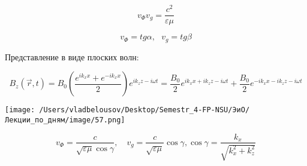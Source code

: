 \documentclass[12pt, a4paper]{report}
\begin{document}
\[ v_{\Phi } v_g = \frac{ c ^2 }{\varepsilon \mu}   \] 

\[ v_{\Phi } = tg \alpha , \text{ }  v_g =  tg \beta \] 

Представление в виде плоских волн: 

\[ B_z (\vec{r }, t ) = B_0 \left( \frac{ e^{i k_x x } + e^{-i k_x x } }{2} \right) e^{i k_z z - i \omega t}  = \frac{B_0 }{2 } e^{ i k_xx + i k_z z - i \omega t} +  \frac{B_0 }{2 } e^{-i k_xx - i k_z z - i \omega t}\]

\begin{center}
    \texttt{[image: /Users/vladbelousov/Desktop/Semestr\_4-FP-NSU/ЭиО/Лекции\_по\_дням/image/57.png]}
\end{center}

\[ v_{\Phi } = \frac{c }{ \sqrt{\varepsilon \mu   }\cos \gamma}  , \quad  v_g = \frac{c }{ \sqrt{\varepsilon \mu  }}\cos \gamma , \cos \gamma = \frac{ k_x }{\sqrt{k_x ^2 + k_z ^2 }}   \] 




\ifdefined\mainfile
\else
    
\end{document}
